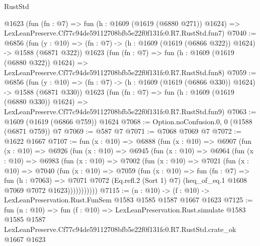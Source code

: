 \begin{lexlean}{RustStd}
\begin{coremodule}
    @1623
    (fun (fn : @7) =>
    fun (h : @1609 (@1619 (@6880 @271)) @1624) =>
    LexLeanPreserve.Cf77c94de59112708bfb5e22f0f131fc0.R7.RustStd.fun7)
@7040 := @6856
    (fun (y : @10) => (fn : @7) -> (h : @1609 (@1619 (@6866 @322)) @1624) -> @1588 (@6871 @322))
    @1623
    (fun (fn : @7) =>
    fun (h : @1609 (@1619 (@6880 @322)) @1624) =>
    LexLeanPreserve.Cf77c94de59112708bfb5e22f0f131fc0.R7.RustStd.fun8)
@7059 := @6856
    (fun (y : @10) => (fn : @7) -> (h : @1609 (@1619 (@6866 @330)) @1624) -> @1588 (@6871 @330))
    @1623
    (fun (fn : @7) =>
    fun (h : @1609 (@1619 (@6880 @330)) @1624) =>
    LexLeanPreserve.Cf77c94de59112708bfb5e22f0f131fc0.R7.RustStd.fun9)
@7063 := @1609 (@1619 (@6866 @759)) @1624
@7068 := Option.noConfusion.{0, 0} (@1588 (@6871 @759)) @7
@7069 := @587 @7
@7071 := @7068 @7069 @7
@7072 := @1622 @1667
@7107 := fun (x : @10) =>
  @6888
    (fun (x : @10) =>
    @6907
      (fun (x : @10) =>
      @6926
        (fun (x : @10) =>
        @6945
          (fun (x : @10) =>
          @6964
            (fun (x : @10) =>
            @6983
              (fun (x : @10) =>
              @7002
                (fun (x : @10) =>
                @7021
                  (fun (x : @10) =>
                  @7040
                    (fun (x : @10) =>
                    @7059
                      (fun (x : @10) =>
                      fun (fn : @7) =>
                      fun (h : @7063) =>
                      @7071
                        @7072
                        (Eq.refl.{2} (Sort 1) @7)
                        (heq_of_eq.{1} @1608 @7069 @7072 @1623)))))))))))
@7115 := (n : @10) -> (f : @10) -> LexLeanPreservation.Rust.FunSem @1583 @1585 @1587 @1667 @1623
@7125 := fun (n : @10) =>
  fun (f : @10) =>
  LexLeanPreservation.Rust.simulate
    @1583
    @1585
    @1587
    LexLeanPreserve.Cf77c94de59112708bfb5e22f0f131fc0.R7.RustStd.crate_ok
    @1667
    @1623
\end{coremodule}
\end{lexlean}
